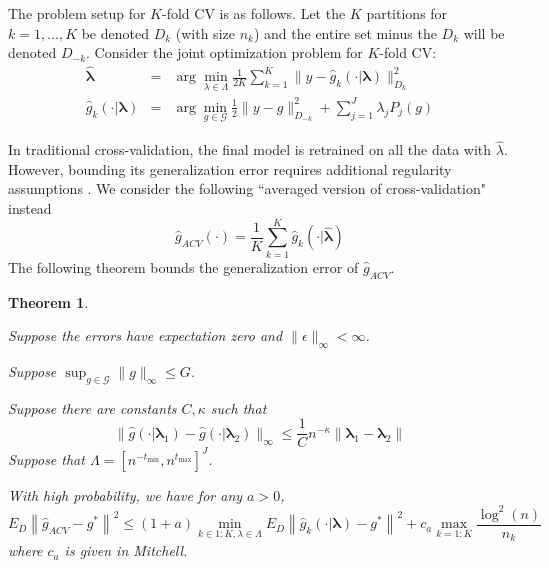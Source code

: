 \documentclass[12pt]{article}
\newtheorem{theorem}{Theorem}
\begin{document}
The problem setup for $K$-fold CV is as follows. Let the $K$ partitions for $k=1,...,K$ be denoted $D_k$ (with size $n_k$) and the entire set minus the $D_k$ will be denoted $D_{-k}$. Consider the joint optimization problem for $K$-fold CV:
\begin{eqnarray}
\label{kfold_opt}
\hat{\boldsymbol \lambda} &=& \arg\min_{\lambda\in\Lambda} \frac{1}{2K} \sum_{k=1}^K  \| y-\hat{g}_{k}(\cdot | \boldsymbol \lambda) \|_{D_k}^{2} \\
\hat{g}_{k}(\cdot | \boldsymbol \lambda) &=&\arg\min_{g\in\mathcal{G}} \frac{1}{2} \| y-g \|_{D_{-k}}^{2} + \sum_{j=1}^J \lambda_j P_j(g)
\end{eqnarray}

In traditional cross-validation, the final model is retrained on all the data with $\hat{\lambda}$. However, bounding its generalization error requires additional regularity assumptions \citep{lecue2012oracle}. We consider the following ``averaged version of cross-validation" instead
\begin{equation}
\hat{g}_{ACV}(\cdot) = \frac{1}{K} \sum_{k=1}^K \hat{g}_{k}
(\cdot | \hat{\boldsymbol \lambda})
\end{equation}
The following theorem bounds the generalization error of $\hat{g}_{ACV}$.

\begin{theorem}
\label{kfold_thrm}

Suppose the errors have expectation zero and $\| \epsilon \|_\infty < \infty $.

Suppose $\sup_{g \in \mathcal{G}} \|g\|_\infty \le G$.

Suppose there are constants $C, \kappa$ such that
\begin{equation}
\| \hat{g}(\cdot | \boldsymbol \lambda_1) - \hat g (\cdot | \boldsymbol \lambda_2) \|_\infty \le \frac{1}{C} n^{-\kappa} \| \boldsymbol \lambda_1 - \boldsymbol \lambda_2 \| 
\end{equation}
Suppose that $\Lambda = [ n^{-t_{\min}}, n^{t_{\max}} ]^J $.


With high probability, we have for any $a > 0$,
\begin{equation}
\label{smooth_error_bound}
E_{D} \left \| \hat{g}_{ACV} - g^* \right \|^2 \le
(1+a) \min_{k\in 1:K, \lambda \in \Lambda}  E_{D} \left \| \hat{g}_k(\cdot |\boldsymbol \lambda) - g^* \right \|^2
+ c_a \max_{k=1:K} \frac{\log^2(n)}{n_k}
\end{equation}
where $c_a$ is given in Mitchell.
\end{theorem}
\end{document}
